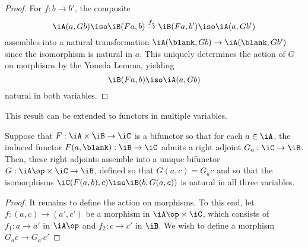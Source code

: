 \documentclass{amsart}
\begin{document}
\begin{proof}
  For $f : b \to b'$, the composite
  \[
    \iA(a, Gb) \iso \iB(Fa, b) \overset{f_{*}}{\to} \iB(Fa, b') \iso \iA(a, Gb')
  \]
  assembles into a natural transformation $\iA(\blank, Gb) \to \iA(\blank, Gb')$ since the isomorphism is natural in $a$.
  This uniquely determines the action of $G$ on morphisms by the Yoneda Lemma, yielding
  \[
    \iB(Fa, b) \iso \iA(a, Gb)
  \]
  natural in both variables.
\end{proof}

This result can be extended to functors in multiple variables.

\begin{lem}
  Suppose that $F : \iA \times \iB \to \iC$ is a bifunctor so that for each $a \in \iA$, the induced functor $F(a, \blank) : \iB \to \iC$ admits a right adjoint $G_{a} : \iC \to \iB$.
  Then, these right adjoints assemble into a unique bifunctor $G : \iA\op \times \iC \to \iB$, defined so that $G(a,c) = G_{a}c$ and so that the isomorphisms $\iC(F(a,b),c) \iso \iB(b, G(a,c))$ is natural in all three variables.
\end{lem}
\begin{proof}
  It remains to define the action on morphisms.
  To this end, let $f : (a, c) \to (a', c')$ be a morphism in $\iA\op \times \iC$, which consists of $f_{1} : a \to a'$ in $\iA\op$ and $f_{2} : c \to c'$ in $\iB$.
  We wish to define a morphism $G_{a}c \to G_{a'}c'$
\end{proof}



\end{document}
